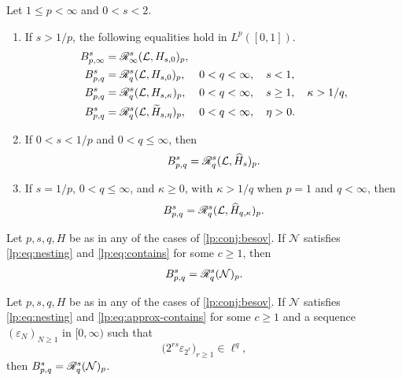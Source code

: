 \documentclass[11pt,a4paper]{article}
\begin{document}
\begin{teorema}
\label{lp:conj:besov}
Let $1\le p<\infty$ and $0<s<2$.
\begin{enumerate}[label=(\roman*)]
\item If $s>1/p$, the following equalities hold in $L^p([0,1])$.
\begin{align}
 B^{s}_{p,\infty}
 &=\mathscr R^{s}_{\infty}(\mathcal L,H_{s,0})_p,
 &&\label{lp:eq:conj-endpoint}\\
 B^{s}_{p,q}
 &=\mathscr R^{s}_{q}(\mathcal L,H_{s,0})_p,
 &&0<q<\infty,\quad s<1,\label{lp:eq:conj-subcritical}\\
 B^{s}_{p,q}
 &=\mathscr R^{s}_{q}(\mathcal L,H_{s,\kappa})_p,
 &&0<q<\infty,\quad s\ge1,\quad\kappa>1/q,\label{lp:eq:conj-critical}\\
 B^{s}_{p,q}
 &=\mathscr R^{s}_{q}(\mathcal L,\widetilde H_{s,\eta})_p,
 &&0<q<\infty,\quad\eta>0.
 \label{lp:eq:besov-tilde}
\end{align}
\item If $0<s<1/p$ and $0<q\le\infty$, then
\begin{equation}
 B^{s}_{p,q}=\mathscr R^{s}_{q}(\mathcal L,\widehat H_{s})_p.
 \label{lp:eq:conj-low}
\end{equation}
\item If $s=1/p$, $0<q\le\infty$, and $\kappa\ge0$, with $\kappa>1/q$ when $p=1$ and $q<\infty$, then
\begin{equation}
 B^{s}_{p,q}=\mathscr R^{s}_{q}(\mathcal L,\widehat H_{q,\kappa})_p.
 \label{lp:eq:conj-diag}
\end{equation}
\end{enumerate}
\end{teorema}

\begin{teorema}
\label{lp:conj:stability}
Let $p,s,q,H$ be as in any of the cases of \cref{lp:conj:besov}. If $\mathcal N$ satisfies \eqref{lp:eq:nesting} and \eqref{lp:eq:contains} for some $c\ge1$, then
\begin{equation}
 B^{s}_{p,q}=\mathscr R^{s}_{q}(\mathcal N)_p.
 \label{lp:eq:network-realization-p}
\end{equation}
\end{teorema}

\begin{teorema}
\label{lp:thm:approx-stability}
Let $p,s,q,H$ be as in any of the cases of \cref{lp:conj:besov}. If $\mathcal N$ satisfies \eqref{lp:eq:nesting} and \eqref{lp:eq:approx-contains} for some $c\ge1$ and a sequence $(\varepsilon_N)_{N\ge1}$ in $[0,\infty)$ such that
\begin{equation}
 \big(2^{rs}\varepsilon_{2^r}\big)_{r\ge1}\in\ell^q,
 \label{lp:eq:approx-summable}
\end{equation}
then $B^{s}_{p,q}=\mathscr R^{s}_{q}(\mathcal N)_p$.
\end{teorema}
\end{document}
